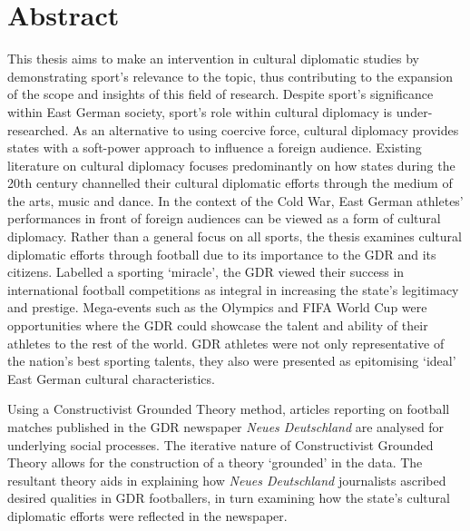 

\chapter*{Abstract}

This thesis aims to make an intervention in cultural diplomatic studies by demonstrating sport’s relevance to the topic, thus contributing to the expansion of the scope and insights of this field of research. Despite sport’s significance within East German society, sport’s role within cultural diplomacy is under-researched. As an alternative to using coercive force, cultural diplomacy provides states with a soft-power approach to influence a foreign audience. Existing literature on cultural diplomacy focuses predominantly on how states during the 20th century channelled their cultural diplomatic efforts through the medium of the arts, music and dance. In the context of the Cold War, East German athletes’ performances in front of foreign audiences can be viewed as a form of cultural diplomacy. Rather than a general focus on all sports, the thesis examines cultural diplomatic efforts through football due to its importance to the GDR and its citizens. Labelled a sporting ‘miracle’, the GDR viewed their success in international football competitions as integral in increasing the state’s legitimacy and prestige. Mega-events such as the Olympics and FIFA World Cup were opportunities where the GDR could showcase the talent and ability of their athletes to the rest of the world. GDR athletes were not only representative of the nation’s best sporting talents, they also were presented as epitomising ‘ideal’ East German cultural characteristics. 

Using a Constructivist Grounded Theory method, articles reporting on football matches published in the GDR newspaper \textit{Neues Deutschland} are analysed for underlying social processes. The iterative nature of Constructivist Grounded Theory allows for the construction of a theory ‘grounded’ in the data. The resultant theory aids in explaining how \textit{Neues Deutschland} journalists ascribed desired qualities in GDR footballers, in turn examining how the state’s cultural diplomatic efforts were reflected in the newspaper.

